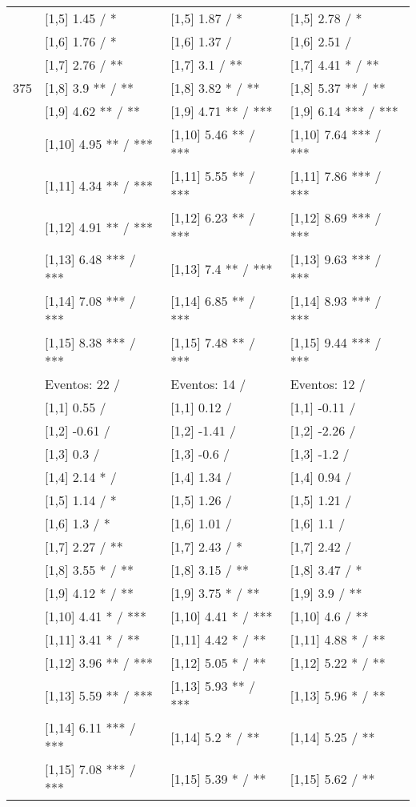 \begin{table}
\begin{tabular}[t]{llll}
 & {}[1,5] 1.45  / * & {}[1,5] 1.87  / * & {}[1,5] 2.78  / *\\
 & {}[1,6] 1.76  / * & {}[1,6] 1.37  / & {}[1,6] 2.51  /\\
 & {}[1,7] 2.76  / ** & {}[1,7] 3.1  / ** & {}[1,7] 4.41 * / **\\
375 & {}[1,8] 3.9 ** / ** & {}[1,8] 3.82 * / ** & {}[1,8] 5.37 ** / **\\
\addlinespace
 & {}[1,9] 4.62 ** / ** & {}[1,9] 4.71 ** / *** & {}[1,9] 6.14 *** / ***\\
 & {}[1,10] 4.95 ** / *** & {}[1,10] 5.46 ** / *** & {}[1,10] 7.64 *** / ***\\
 & {}[1,11] 4.34 ** / *** & {}[1,11] 5.55 ** / *** & {}[1,11] 7.86 *** / ***\\
 & {}[1,12] 4.91 ** / *** & {}[1,12] 6.23 ** / *** & {}[1,12] 8.69 *** / ***\\
 & {}[1,13] 6.48 *** / *** & {}[1,13] 7.4 ** / *** & {}[1,13] 9.63 *** / ***\\
\addlinespace
 & {}[1,14] 7.08 *** / *** & {}[1,14] 6.85 ** / *** & {}[1,14] 8.93 *** / ***\\
 & {}[1,15] 8.38 *** / *** & {}[1,15] 7.48 ** / *** & {}[1,15] 9.44 *** / ***\\
 & Eventos:  22 / & Eventos:  14 / & Eventos:  12 /\\
 & {}[1,1] 0.55  / & {}[1,1] 0.12  / & {}[1,1] -0.11  /\\
 & {}[1,2] -0.61  / & {}[1,2] -1.41  / & {}[1,2] -2.26  /\\
\addlinespace
 & {}[1,3] 0.3  / & {}[1,3] -0.6  / & {}[1,3] -1.2  /\\
 & {}[1,4] 2.14 * / & {}[1,4] 1.34  / & {}[1,4] 0.94  /\\
 & {}[1,5] 1.14  / * & {}[1,5] 1.26  / & {}[1,5] 1.21  /\\
 & {}[1,6] 1.3  / * & {}[1,6] 1.01  / & {}[1,6] 1.1  /\\
 & {}[1,7] 2.27  / ** & {}[1,7] 2.43  / * & {}[1,7] 2.42  /\\
\addlinespace
500 & {}[1,8] 3.55 * / ** & {}[1,8] 3.15  / ** & {}[1,8] 3.47  / *\\
 & {}[1,9] 4.12 * / ** & {}[1,9] 3.75 * / ** & {}[1,9] 3.9  / **\\
 & {}[1,10] 4.41 * / *** & {}[1,10] 4.41 * / *** & {}[1,10] 4.6  / **\\
 & {}[1,11] 3.41 * / ** & {}[1,11] 4.42 * / ** & {}[1,11] 4.88 * / **\\
 & {}[1,12] 3.96 ** / *** & {}[1,12] 5.05 * / ** & {}[1,12] 5.22 * / **\\
\addlinespace
 & {}[1,13] 5.59 ** / *** & {}[1,13] 5.93 ** / *** & {}[1,13] 5.96 * / **\\
 & {}[1,14] 6.11 *** / *** & {}[1,14] 5.2 * / ** & {}[1,14] 5.25  / **\\
 & {}[1,15] 7.08 *** / *** & {}[1,15] 5.39 * / ** & {}[1,15] 5.62  / **\\
\bottomrule
\end{tabular}
\end{table}
